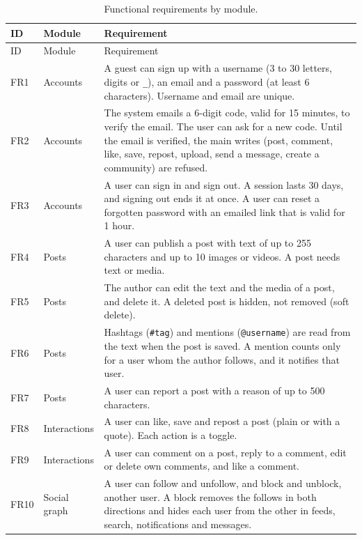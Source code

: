 {\small\singlespacing
\begin{longtable}{@{}>{\raggedright\arraybackslash}p{1.1cm} >{\raggedright\arraybackslash}p{2.5cm} >{\raggedright\arraybackslash}p{\dimexpr\textwidth-3.6cm-4\tabcolsep\relax}@{}}
  \caption{Functional requirements by module.}
  \label{tab:design-fr}\\
  \toprule
  ID & Module & Requirement \\
  \midrule
  \endfirsthead
  \toprule
  ID & Module & Requirement \\
  \midrule
  \endhead
  \bottomrule
  \endlastfoot
  FR1  & Accounts & A guest can sign up with a username (3 to 30 letters, digits or \texttt{\_}), an email and a password (at least 6 characters). Username and email are unique. \\
  FR2  & Accounts & The system emails a 6-digit code, valid for 15 minutes, to verify the email. The user can ask for a new code. Until the email is verified, the main writes (post, comment, like, save, repost, upload, send a message, create a community) are refused. \\
  FR3  & Accounts & A user can sign in and sign out. A session lasts 30 days, and signing out ends it at once. A user can reset a forgotten password with an emailed link that is valid for 1 hour. \\
  FR4  & Posts & A user can publish a post with text of up to 255 characters and up to 10 images or videos. A post needs text or media. \\
  FR5  & Posts & The author can edit the text and the media of a post, and delete it. A deleted post is hidden, not removed (soft delete). \\
  FR6  & Posts & Hashtags (\texttt{\#tag}) and mentions (\texttt{@username}) are read from the text when the post is saved. A mention counts only for a user whom the author follows, and it notifies that user. \\
  FR7  & Posts & A user can report a post with a reason of up to 500 characters. \\
  FR8  & Interactions & A user can like, save and repost a post (plain or with a quote). Each action is a toggle. \\
  FR9  & Interactions & A user can comment on a post, reply to a comment, edit or delete own comments, and like a comment. \\
  FR10 & Social graph & A user can follow and unfollow, and block and unblock, another user. A block removes the follows in both directions and hides each user from the other in feeds, search, notifications and messages. \\

\end{longtable}}
